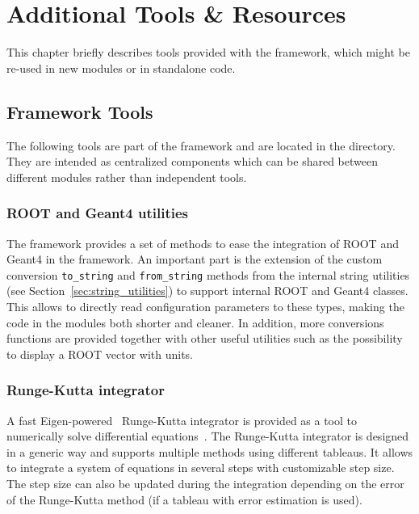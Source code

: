 \chapter{Additional Tools \& Resources}
\label{ch:additional_tools_resources}

This chapter briefly describes tools provided with the \apsq framework, which might be re-used in new modules or in standalone code.

\section{Framework Tools}

The following tools are part of the \apsq framework and are located in the  directory.
They are intended as centralized components which can be shared between different modules rather than independent tools.

\subsection{ROOT and Geant4 utilities}
\label{sec:root_and_geant4_utilities}
The framework provides a set of methods to ease the integration of ROOT and Geant4 in the framework.
An important part is the extension of the custom conversion \texttt{to\_string} and \texttt{from\_string} methods from the internal string utilities (see Section~\ref{sec:string_utilities}) to support internal ROOT and Geant4 classes.
This allows to directly read configuration parameters to these types, making the code in the modules both shorter and cleaner.
In addition, more conversions functions are provided together with other useful utilities such as the possibility to display a ROOT vector with units.

\subsection{Runge-Kutta integrator}
A fast Eigen-powered~\cite{eigen3} Runge-Kutta integrator is provided as a tool to numerically solve differential equations~\cite{fehlberg}.
The Runge-Kutta integrator is designed in a generic way and supports multiple methods using different tableaus.
It allows to integrate a system of equations in several steps with customizable step size.
The step size can also be updated during the integration depending on the error of the Runge-Kutta method (if a tableau with error estimation is used).


